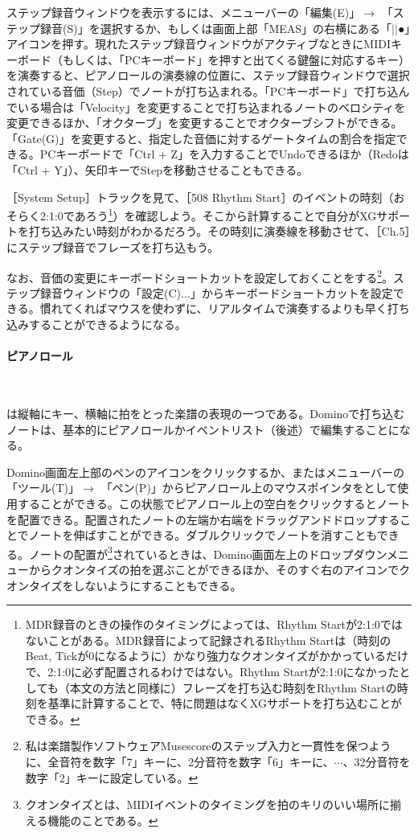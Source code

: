 \documentclass[uplatex, 10pt, dvipdfmx]{jsarticle}
\numberwithin{equation}{section}
\newcommand{\emphj}[1]{\textbf{\textrm{\textgt{{#1}}}}}
\begin{document}
ステップ録音ウィンドウを表示するには、メニューバーの「編集(E)」$\rightarrow$ 「ステップ録音(S)」を選択するか、もしくは画面上部「MEAS」の右横にある「$\vert\vert$●」アイコンを押す。現れたステップ録音ウィンドウがアクティブなときにMIDIキーボード（もしくは、「PCキーボード」を押すと出てくる鍵盤に対応するキー）を演奏すると、ピアノロールの演奏線の位置に、ステップ録音ウィンドウで選択されている音価（Step）でノートが打ち込まれる。「PCキーボード」で打ち込んでいる場合は「Velocity」を変更することで打ち込まれるノートのベロシティを変更できるほか、「オクターブ」を変更することでオクターブシフトができる。「Gate(G)」を変更すると、指定した音価に対するゲートタイムの割合を指定できる。PCキーボードで「Ctrl + Z」を入力することでUndoできるほか（Redoは「Ctrl + Y」）、矢印キーでStepを移動させることもできる。

［System Setup］トラックを見て、［508 Rhythm Start］のイベントの時刻（おそらく2:1:0であろう\footnote{MDR録音のときの操作のタイミングによっては、Rhythm Startが2:1:0ではないことがある。MDR録音によって記録されるRhythm Startは（時刻のBeat, Tickが0になるように）かなり強力なクオンタイズがかかっているだけで、2:1:0に必ず配置されるわけではない。Rhythm Startが2:1:0になかったとしても（本文の方法と同様に）フレーズを打ち込む時刻をRhythm Startの時刻を基準に計算することで、特に問題はなくXGサポートを打ち込むことができる。}）を確認しよう。そこから計算することで自分がXGサポートを打ち込みたい時刻がわかるだろう。その時刻に演奏線を移動させて、［Ch.5］にステップ録音でフレーズを打ち込もう。

なお、音価の変更にキーボードショートカットを設定しておくことを\emphj{強く推奨}する\footnote{私は楽譜製作ソフトウェアMusescoreのステップ入力と一貫性を保つように、全音符を数字「7」キーに、2分音符を数字「6」キーに、$\cdots$、32分音符を数字「2」キーに設定している。}。ステップ録音ウィンドウの「設定(C)...」からキーボードショートカットを設定できる。慣れてくればマウスを使わずに、リアルタイムで演奏するよりも早く打ち込みすることができるようになる。

\paragraph{ピアノロール} \

\emphj{ピアノロール}は縦軸にキー、横軸に拍をとった楽譜の表現の一つである。Dominoで打ち込むノートは、基本的にピアノロールかイベントリスト（後述）で編集することになる。

Domino画面左上部のペンのアイコンをクリックするか、またはメニューバーの「ツール(T)」$\rightarrow$ 「ペン(P)」からピアノロール上のマウスポインタを\emphj{ペンツール}として使用することができる。この状態でピアノロール上の空白をクリックするとノートを配置できる。配置されたノートの左端か右端をドラッグアンドドロップすることでノートを伸ばすことができる。ダブルクリックでノートを消すこともできる。ノートの配置が\emphj{クオンタイズ}\footnote{クオンタイズとは、MIDIイベントのタイミングを拍のキリのいい場所に揃える機能のことである。}されているときは、Domino画面左上のドロップダウンメニューからクオンタイズの拍を選ぶことができるほか、そのすぐ右のアイコンでクオンタイズをしないようにすることもできる。
\end{document}
